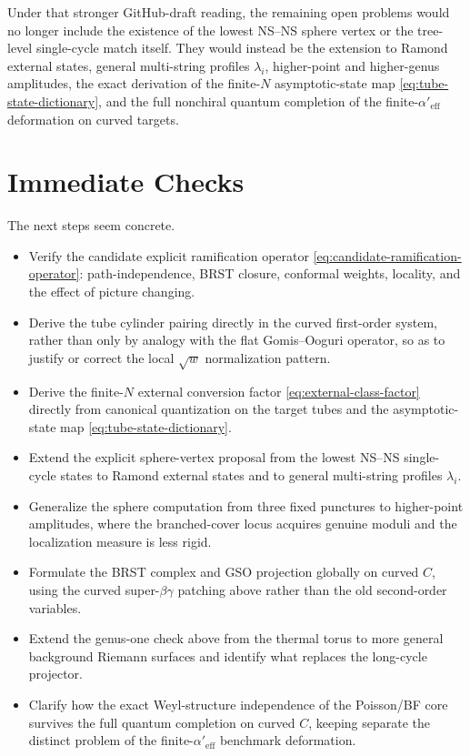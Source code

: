 \documentclass[11pt]{article}
\newcommand{\Aeff}{\alpha'_{\mathrm{eff}}}
\begin{document}
Under that stronger GitHub-draft reading, the remaining open problems would no longer include the existence of the lowest NS--NS sphere vertex or the tree-level single-cycle match itself. They would instead be the extension to Ramond external states, general multi-string profiles $\lambda_i$, higher-point and higher-genus amplitudes, the exact derivation of the finite-$N$ asymptotic-state map \eqref{eq:tube-state-dictionary}, and the full nonchiral quantum completion of the finite-$\Aeff$ deformation on curved targets.

\section{Immediate Checks}
The next steps seem concrete.
\begin{itemize}
\item Verify the candidate explicit ramification operator \eqref{eq:candidate-ramification-operator}: path-independence, BRST closure, conformal weights, locality, and the effect of picture changing.
\item Derive the tube cylinder pairing directly in the curved first-order system, rather than only by analogy with the flat Gomis--Ooguri operator, so as to justify or correct the local $\sqrt{w}$ normalization pattern.
\item Derive the finite-$N$ external conversion factor \eqref{eq:external-class-factor} directly from canonical quantization on the target tubes and the asymptotic-state map \eqref{eq:tube-state-dictionary}.
\item Extend the explicit sphere-vertex proposal from the lowest NS--NS single-cycle states to Ramond external states and to general multi-string profiles $\lambda_i$.
\item Generalize the sphere computation from three fixed punctures to higher-point amplitudes, where the branched-cover locus acquires genuine moduli and the localization measure is less rigid.
\item Formulate the BRST complex and GSO projection globally on curved $C$, using the curved super-$\beta\gamma$ patching above rather than the old second-order variables.
\item Extend the genus-one check above from the thermal torus to more general background Riemann surfaces and identify what replaces the long-cycle projector.
\item Clarify how the exact Weyl-structure independence of the Poisson/BF core survives the full quantum completion on curved $C$, keeping separate the distinct problem of the finite-$\Aeff$ benchmark deformation.

\end{itemize}
\end{document}
